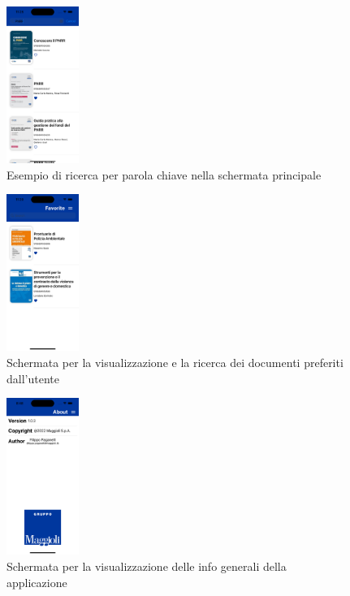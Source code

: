 \begin{multicols}{3}
            \begin{figure}[H]
                \includegraphics[width=0.21\textwidth]{img/Simulator Screen Shot - iPhone 14 Pro - 2022-10-05 at 11.25.21.png}
                \caption{Esempio di ricerca per parola chiave nella schermata principale}
                \label{ricercaios}
            \end{figure}

            \begin{figure}[H]
                \includegraphics[width=0.21\textwidth]{img/Simulator Screen Shot - iPhone 14 Pro - 2022-10-05 at 11.20.04.png}
                \caption{Schermata per la visualizzazione e la ricerca dei documenti preferiti dall'utente}
                \label{preferitiios}
            \end{figure}

            \begin{figure}[H]
                \includegraphics[width=0.21\textwidth]{img/Simulator Screen Shot - iPhone 14 Pro - 2022-10-10 at 08.48.05.png}
                \caption{Schermata per la visualizzazione delle info generali della applicazione}
                \label{aboutios}
            \end{figure}


\end{multicols}
